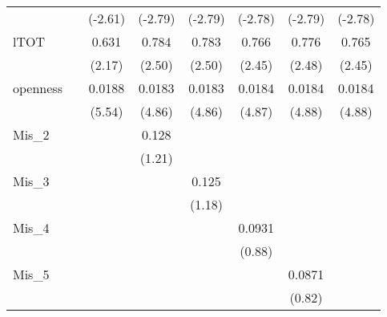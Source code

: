 \documentclass{article}
\begin{document}
{\begin{tabular}{l*{7}{c}}
            &                     &     (-2.61)         &     (-2.79)         &     (-2.79)         &     (-2.78)         &     (-2.79)         &     (-2.78)         \\
[1em]
lTOT        &                     &       0.631\sym{*}  &       0.784\sym{*}  &       0.783\sym{*}  &       0.766\sym{*}  &       0.776\sym{*}  &       0.765\sym{*}  \\
            &                     &      (2.17)         &      (2.50)         &      (2.50)         &      (2.45)         &      (2.48)         &      (2.45)         \\
[1em]
openness    &                     &      0.0188\sym{***}&      0.0183\sym{***}&      0.0183\sym{***}&      0.0184\sym{***}&      0.0184\sym{***}&      0.0184\sym{***}\\
            &                     &      (5.54)         &      (4.86)         &      (4.86)         &      (4.87)         &      (4.88)         &      (4.88)         \\
[1em]
Mis\_2       &                     &                     &       0.128         &                     &                     &                     &                     \\
            &                     &                     &      (1.21)         &                     &                     &                     &                     \\
[1em]
Mis\_3       &                     &                     &                     &       0.125         &                     &                     &                     \\
            &                     &                     &                     &      (1.18)         &                     &                     &                     \\
[1em]
Mis\_4       &                     &                     &                     &                     &      0.0931         &                     &                     \\
            &                     &                     &                     &                     &      (0.88)         &                     &                     \\
[1em]
Mis\_5       &                     &                     &                     &                     &                     &      0.0871         &                     \\
            &                     &                     &                     &                     &                     &      (0.82)         &                     \\

\end{tabular}}
\end{document}
